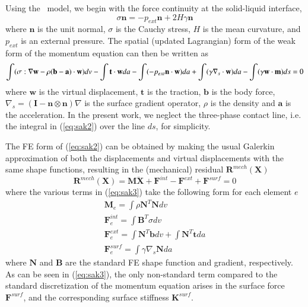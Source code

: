 \documentclass[final,authoryear,3p,times]{elsarticle}
\newcommand{\mbf}{\mathbf}
\begin{document}
Using the~\citet{saksonoCM2006a} model, we begin with the force continuity at the solid-liquid interface, 
\begin{equation}\label{eq:sak1} {\sigma} \mbf{n}=-p_{ext}\mbf{n}+2H\gamma\mbf{n}
\end{equation}
where $\mbf{n}$ is the unit normal, $\sigma$ is the Cauchy stress, $H$ is the mean curvature, and $p_{ext}$ is an external pressure.  The spatial (updated Lagrangian) form of the weak form of the momentum equation can then be written as
\begin{dmath}\label{eq:sak2} \int (\sigma:\nabla\mbf{w}-\rho(\mbf{b-a})\cdot\mbf{w})dv-\int \mbf{t}\cdot\mbf{w}da-\int (-p_{ext}\mbf{n}\cdot\mbf{w})da \\ \nonumber
+\int (\gamma\nabla_{s}\cdot\mbf{w})da-\int (\gamma\mbf{w}\cdot\mbf{m})ds = 0
\end{dmath}
where $\mbf{w}$ is the virtual displacement, $\mbf{t}$ is the traction, $\mbf{b}$ is the body force, $\nabla_{s}=(\mbf{I}-\mbf{n}\otimes\mbf{n})\nabla$ is the surface gradient operator, $\rho$ is the density and $\mbf{a}$ is the acceleration.  In the present work, we neglect the three-phase contact line, i.e. the integral in (\ref{eq:sak2}) over the line $ds$, for simplicity.

The FE form of (\ref{eq:sak2}) can be obtained by making the usual Galerkin approximation of both the displacements and virtual displacements with the same shape functions, resulting in the (mechanical) residual $\mbf{R}^{mech}(\mbf{X})$
\begin{equation}\label{eq:sak3} \mbf{R}^{mech}(\mbf{X})=\mbf{M}\ddot{\mbf{X}}+\mbf{F}^{int}-\mbf{F}^{ext}+\mbf{F}^{surf}=0
\end{equation}
where the various terms in (\ref{eq:sak3}) take the following form for each element $e$
\begin{eqnarray}\label{eq:sak4} \mbf{M}_{e}=\int\rho\mbf{N}^{T}\mbf{N}dv \\ \nonumber
\mbf{F}_{e}^{int}=\int\mbf{B}^{T}\sigma dv \\ \nonumber
\mbf{F}_{e}^{ext}=\int\mbf{N}^{T}\mbf{b}dv + \int\mbf{N}^{T}\mbf{t}da \\ \nonumber
\mbf{F}_{e}^{surf}=\int\gamma\nabla_{s}\mbf{N}da
\end{eqnarray}
where $\mbf{N}$ and $\mbf{B}$ are the standard FE shape function and gradient, respectively.  As can be seen in (\ref{eq:sak3}), the only non-standard term compared to the standard discretization of the momentum equation arises in the surface force $\mbf{F}^{surf}$, and the corresponding surface stiffness $\mbf{K}^{surf}$.  
\end{document}
